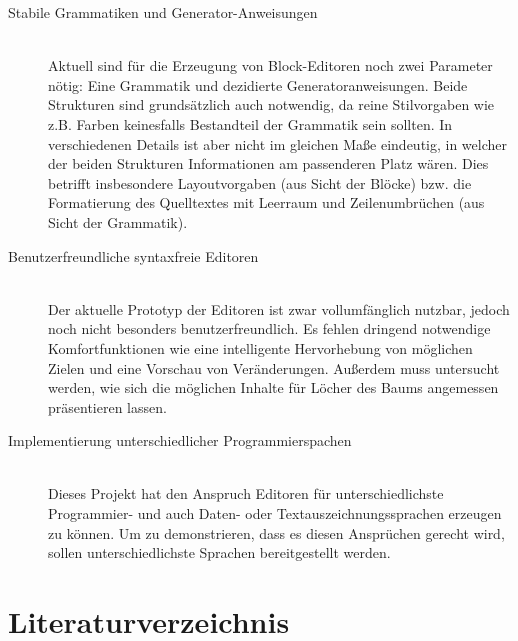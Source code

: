 \documentclass[paper=a4,fontsize=12pt,parskip=half]{scrartcl}
\begin{document}
\begin{description}
\item[Stabile Grammatiken und Generator-Anweisungen] \hfill\\
  Aktuell sind für die Erzeugung von Block-Editoren noch zwei Parameter nötig: Eine Grammatik und dezidierte Generatoranweisungen. Beide Strukturen sind grundsätzlich auch notwendig, da reine Stilvorgaben wie z.B. Farben keinesfalls Bestandteil der Grammatik sein sollten. In verschiedenen Details ist aber nicht im gleichen Maße eindeutig, in welcher der beiden Strukturen Informationen am passenderen Platz wären. Dies betrifft insbesondere Layoutvorgaben (aus Sicht der Blöcke) bzw. die Formatierung des Quelltextes mit Leerraum und Zeilenumbrüchen (aus Sicht der Grammatik).

\item[Benutzerfreundliche syntaxfreie Editoren] \hfill\\
  Der aktuelle Prototyp der Editoren ist zwar vollumfänglich nutzbar, jedoch noch nicht besonders benutzerfreundlich. Es fehlen dringend notwendige Komfortfunktionen wie eine intelligente Hervorhebung von möglichen Zielen und eine Vorschau von Veränderungen. Außerdem muss untersucht werden, wie sich die möglichen Inhalte für Löcher des Baums angemessen präsentieren lassen.

\item[Implementierung unterschiedlicher Programmierspachen] \hfill\\
  Dieses Projekt hat den Anspruch Editoren für unterschiedlichste Programmier- und auch Daten- oder Textauszeichnungssprachen erzeugen zu können. Um zu demonstrieren, dass es diesen Ansprüchen gerecht wird, sollen unterschiedlichste Sprachen bereitgestellt werden.
\end{description}







\section{Literaturverzeichnis}
\printbibliography[heading=none]
\end{document}
